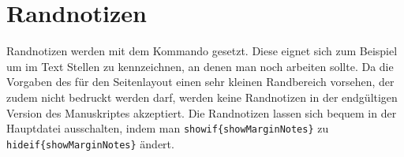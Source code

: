 \section{Randnotizen}%
\label{sec:Randnotizen}
%
Randnotizen 
%
werden mit dem Kommando  gesetzt.
Diese eignet sich zum Beispiel um im Text Stellen zu kennzeichnen,
an denen man noch arbeiten sollte.
Da die Vorgaben des  für den Seitenlayout
einen sehr kleinen Randbereich vorsehen, der zudem nicht bedruckt werden darf,
werden keine Randnotizen in der endgültigen Version des Manuskriptes akzeptiert.
Die Randnotizen lassen sich bequem in der Hauptdatei ausschalten,
indem man \texttt{\bs showif\{showMarginNotes\}}
zu \texttt{\bs hideif\{showMarginNotes\}} ändert.